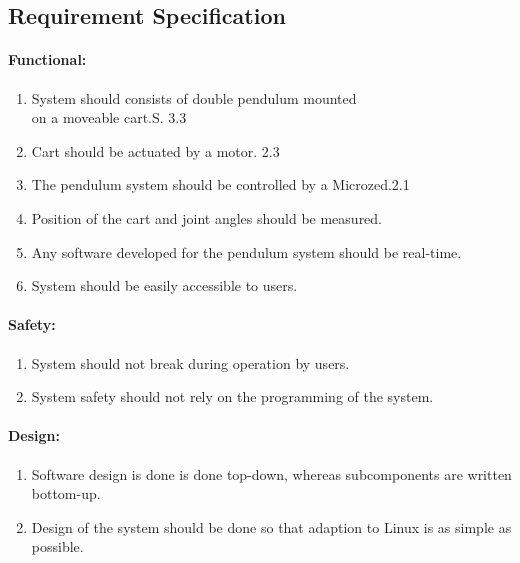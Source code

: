 \subsection{Requirement Specification}
\label{sub:requirements}

\paragraph{Functional:}
\begin{enumerate}	
	\item System should consists of double pendulum mounted\\ on a moveable cart.\hfill S. 3.3
	\item Cart should be actuated by a motor. \hfill 2.3
	\item The pendulum system should be controlled by a Microzed.\hfill 2.1
	\item Position of the cart and joint angles should be measured.
	\item Any software developed for the pendulum system should be real-time.
	\item System should be easily accessible to users.
\end{enumerate}

\paragraph{Safety:}
\begin{enumerate}[resume]
	\item System should not break during operation by users.
	\item System safety should not rely on the programming of the system.
\end{enumerate}

\paragraph{Design:}
\begin{enumerate}[resume]
	 \item Software design is done is done top-down, whereas subcomponents are written bottom-up. 
	 \item Design of the system should be done so that adaption to Linux is as simple as possible.
\end{enumerate}